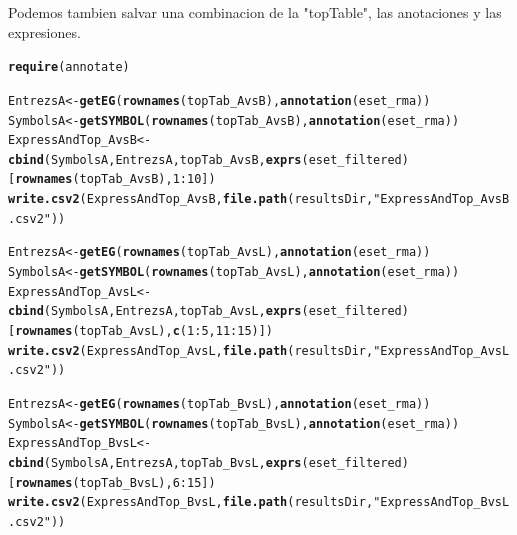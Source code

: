\documentclass[a4paper]{article}\usepackage[]{graphicx}\usepackage[]{color}
\makeatletter
\newcommand{\hlnum}[1]{\textcolor[rgb]{0.686,0.059,0.569}{#1}}%
\newcommand{\hlstr}[1]{\textcolor[rgb]{0.192,0.494,0.8}{#1}}%
\newcommand{\hlopt}[1]{\textcolor[rgb]{0,0,0}{#1}}%
\newcommand{\hlstd}[1]{\textcolor[rgb]{0.345,0.345,0.345}{#1}}%
\newcommand{\hlkwb}[1]{\textcolor[rgb]{0.69,0.353,0.396}{#1}}%
\newcommand{\hlkwd}[1]{\textcolor[rgb]{0.737,0.353,0.396}{\textbf{#1}}}%
\newenvironment{kframe}{%
 \def\at@end@of@kframe{}%
 \ifinner\ifhmode%
  \def\at@end@of@kframe{\end{minipage}}%
  \begin{minipage}{\columnwidth}%
 \fi\fi%
 \def\FrameCommand##1{\hskip\@totalleftmargin \hskip-\fboxsep
 \colorbox{shadecolor}{##1}\hskip-\fboxsep
     \hskip-\linewidth \hskip-\@totalleftmargin \hskip\columnwidth}%
 \MakeFramed {\advance\hsize-\width
   \@totalleftmargin\z@ \linewidth\hsize
   \@setminipage}}%
 {\par\unskip\endMakeFramed%
 \at@end@of@kframe}
\newenvironment{knitrout}{}{} %
\makeatother
\begin{document}
Podemos tambien salvar una combinacion de la "topTable", las anotaciones y las expresiones.
\begin{knitrout}
\color{fgcolor}\begin{kframe}
\begin{alltt}
\hlkwd{require}\hlstd{(annotate)}

\hlstd{EntrezsA} \hlkwb{<-} \hlkwd{getEG} \hlstd{(}\hlkwd{rownames}\hlstd{(topTab_AvsB),} \hlkwd{annotation}\hlstd{(eset_rma))}
\hlstd{SymbolsA} \hlkwb{<-} \hlkwd{getSYMBOL} \hlstd{(}\hlkwd{rownames}\hlstd{(topTab_AvsB),} \hlkwd{annotation}\hlstd{(eset_rma))}
\hlstd{ExpressAndTop_AvsB} \hlkwb{<-} \hlkwd{cbind}\hlstd{(SymbolsA, EntrezsA, topTab_AvsB,} \hlkwd{exprs}\hlstd{(eset_filtered)[}\hlkwd{rownames}\hlstd{(topTab_AvsB),} \hlnum{1}\hlopt{:}\hlnum{10}\hlstd{])}
\hlkwd{write.csv2}\hlstd{(ExpressAndTop_AvsB,} \hlkwd{file.path}\hlstd{(resultsDir,} \hlstr{"ExpressAndTop_AvsB.csv2"}\hlstd{))}

\hlstd{EntrezsA} \hlkwb{<-} \hlkwd{getEG} \hlstd{(}\hlkwd{rownames}\hlstd{(topTab_AvsL),} \hlkwd{annotation}\hlstd{(eset_rma))}
\hlstd{SymbolsA} \hlkwb{<-} \hlkwd{getSYMBOL} \hlstd{(}\hlkwd{rownames}\hlstd{(topTab_AvsL),} \hlkwd{annotation}\hlstd{(eset_rma))}
\hlstd{ExpressAndTop_AvsL} \hlkwb{<-} \hlkwd{cbind}\hlstd{(SymbolsA, EntrezsA, topTab_AvsL,} \hlkwd{exprs}\hlstd{(eset_filtered)[}\hlkwd{rownames}\hlstd{(topTab_AvsL),} \hlkwd{c}\hlstd{(}\hlnum{1}\hlopt{:}\hlnum{5}\hlstd{,}\hlnum{11}\hlopt{:}\hlnum{15}\hlstd{)])}
\hlkwd{write.csv2}\hlstd{(ExpressAndTop_AvsL,} \hlkwd{file.path}\hlstd{(resultsDir,} \hlstr{"ExpressAndTop_AvsL.csv2"}\hlstd{))}

\hlstd{EntrezsA} \hlkwb{<-} \hlkwd{getEG} \hlstd{(}\hlkwd{rownames}\hlstd{(topTab_BvsL),} \hlkwd{annotation}\hlstd{(eset_rma))}
\hlstd{SymbolsA} \hlkwb{<-} \hlkwd{getSYMBOL} \hlstd{(}\hlkwd{rownames}\hlstd{(topTab_BvsL),} \hlkwd{annotation}\hlstd{(eset_rma))}
\hlstd{ExpressAndTop_BvsL} \hlkwb{<-} \hlkwd{cbind}\hlstd{(SymbolsA, EntrezsA, topTab_BvsL,} \hlkwd{exprs}\hlstd{(eset_filtered)[}\hlkwd{rownames}\hlstd{(topTab_BvsL),} \hlnum{6}\hlopt{:}\hlnum{15}\hlstd{])}
\hlkwd{write.csv2}\hlstd{(ExpressAndTop_BvsL,} \hlkwd{file.path}\hlstd{(resultsDir,} \hlstr{"ExpressAndTop_BvsL.csv2"}\hlstd{))}
\end{alltt}
\end{kframe}
\end{knitrout}
\end{document}
